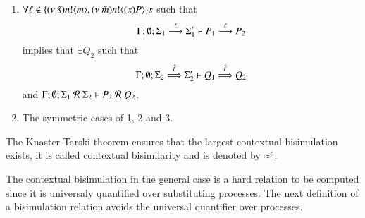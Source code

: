 \begin{definition}
\begin{enumerate}
		\item	$\forall \ell \notin \{(\nu\ \tilde{s}) n ! \langle m \rangle, (\nu\ \tilde{m}) n ! \langle (x)P \rangle\}s$ such that
			\[
				\Gamma; \emptyset; \Sigma_1 \stackrel{\ell}{\longrightarrow} \Sigma_1' \vdash P_1 \stackrel{\ell}{\longrightarrow} P_2
			\]
			implies that $\exists Q_2$ such that 
			\[
				\Gamma; \emptyset; \Sigma_2 \stackrel{\hat{\ell}}{\Longrightarrow} \Sigma_2' \vdash Q_1 \stackrel{\hat{\ell}}{\Longrightarrow} Q_2
			\]
			and
			$\Gamma; \emptyset; \Sigma_1\ \mathcal{R}\ \Sigma_2 \proves P_2\ \mathcal{R}\ Q_2$.

		\item	The symmetric cases of 1, 2 and 3.
	\end{enumerate}
	The Knaster Tarski theorem ensures that the largest contextual bisimulation exists, it is called contextual bisimilarity and is denoted by $\approx^c$.
\end{definition}

The contextual bisimulation in the general case is a hard relation to be computed
since it is universaly quantified over substituting processes. The next definition
of a bisimulation relation avoids the universal quantifier over processes.

\newcommand{\outtrigger}[2]{\binp{#1}{X} \newsp{s''}{\appl{X}{s''} \Par \bout{\dual{s''}}{#2} \inact} }
\newcommand{\nametrigger}[2]{\binp{#1}{X} \appl{X}{#2}}

